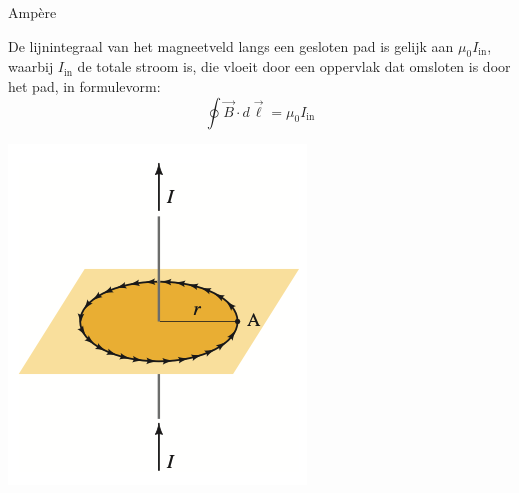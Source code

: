 \begin{lem}[Ampère]{Ampère}
    \vspace{-0.75cm}\begin{minipage}{0.79\textwidth}
        De lijnintegraal van het magneetveld langs een gesloten pad is gelijk aan $\mu_{0}I_{\text{in}}$, waarbij $I_{\text{in}}$ de totale stroom is, die vloeit door een oppervlak dat omsloten is door het pad, in formulevorm:
        \begin{equation*}
            \oint \Vec{B} \cdot d\Vec{\ell} = \mu_{0}I_{\text{in}}
        \end{equation*}
    \end{minipage}
    \begin{minipage}{.17\textwidth}
        \includegraphics[scale=0.3]{Images/Magnetisme/WetVanAmpere}
    \end{minipage}
\end{lem}

\newpage

